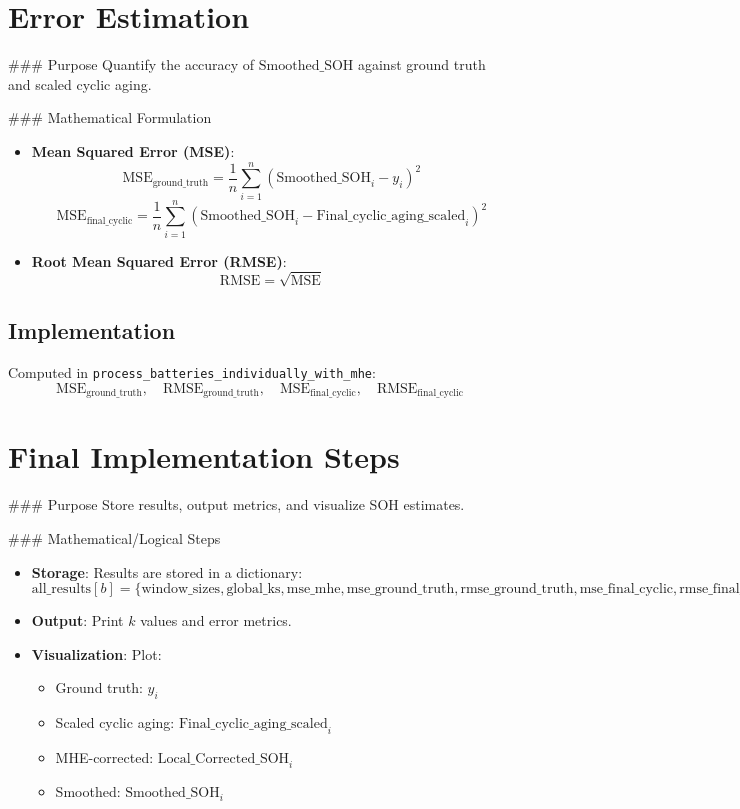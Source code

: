 \section{Error Estimation}

### Purpose
Quantify the accuracy of \(\text{Smoothed_SOH}\) against ground truth and scaled cyclic aging.

### Mathematical Formulation
\begin{itemize}
    \item \textbf{Mean Squared Error (MSE)}:
    \[
    \text{MSE}_{\text{ground_truth}} = \frac{1}{n} \sum_{i=1}^{n} (\text{Smoothed_SOH}_i - y_i)^2
    \]
    \[
    \text{MSE}_{\text{final_cyclic}} = \frac{1}{n} \sum_{i=1}^{n} (\text{Smoothed_SOH}_i - \text{Final_cyclic_aging_scaled}_i)^2
    \]
    \item \textbf{Root Mean Squared Error (RMSE)}:
    \[
    \text{RMSE} = \sqrt{\text{MSE}}
    \]
\end{itemize}

\subsection{Implementation}
Computed in \texttt{process\_batteries\_individually\_with\_mhe}:
\[
\text{MSE}_{\text{ground_truth}}, \quad \text{RMSE}_{\text{ground_truth}}, \quad \text{MSE}_{\text{final_cyclic}}, \quad \text{RMSE}_{\text{final_cyclic}}
\]

\section{Final Implementation Steps}

### Purpose
Store results, output metrics, and visualize SOH estimates.

### Mathematical/Logical Steps
\begin{itemize}
    \item \textbf{Storage}: Results are stored in a dictionary:
    \[
    \text{all_results}[b] = \{ \text{window_sizes}, \text{global_ks}, \text{mse_mhe}, \text{mse_ground_truth}, \text{rmse_ground_truth}, \text{mse_final_cyclic}, \text{rmse_final_cyclic}, \text{df} \}
    \]
    \item \textbf{Output}: Print \(k\) values and error metrics.
    \item \textbf{Visualization}: Plot:
    \begin{itemize}
        \item Ground truth: \(y_i\)
        \item Scaled cyclic aging: \(\text{Final_cyclic_aging_scaled}_i\)
        \item MHE-corrected: \(\text{Local_Corrected_SOH}_i\)
        \item Smoothed: \(\text{Smoothed_SOH}_i\)
    \end{itemize}
\end{itemize}

